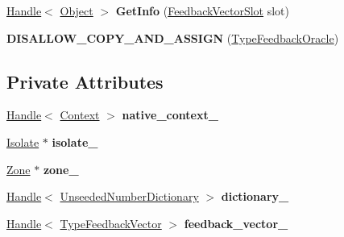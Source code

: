 \begin{DoxyCompactItemize}
\item 
\hyperlink{classv8_1_1internal_1_1_handle}{Handle}$<$ \hyperlink{classv8_1_1internal_1_1_object}{Object} $>$ {\bfseries Get\+Info} (\hyperlink{classv8_1_1internal_1_1_feedback_vector_slot}{Feedback\+Vector\+Slot} slot)\hypertarget{classv8_1_1internal_1_1_type_feedback_oracle_a4c30d4b5f974e80bd8af7c8eccbdd969}{}\label{classv8_1_1internal_1_1_type_feedback_oracle_a4c30d4b5f974e80bd8af7c8eccbdd969}

\item 
{\bfseries D\+I\+S\+A\+L\+L\+O\+W\+\_\+\+C\+O\+P\+Y\+\_\+\+A\+N\+D\+\_\+\+A\+S\+S\+I\+GN} (\hyperlink{classv8_1_1internal_1_1_type_feedback_oracle}{Type\+Feedback\+Oracle})\hypertarget{classv8_1_1internal_1_1_type_feedback_oracle_a8e885bb296bb4da312e35384d309c1af}{}\label{classv8_1_1internal_1_1_type_feedback_oracle_a8e885bb296bb4da312e35384d309c1af}

\end{DoxyCompactItemize}
\subsection*{Private Attributes}
\begin{DoxyCompactItemize}
\item 
\hyperlink{classv8_1_1internal_1_1_handle}{Handle}$<$ \hyperlink{classv8_1_1internal_1_1_context}{Context} $>$ {\bfseries native\+\_\+context\+\_\+}\hypertarget{classv8_1_1internal_1_1_type_feedback_oracle_a26b8279872c7ea341d1eef90efb31459}{}\label{classv8_1_1internal_1_1_type_feedback_oracle_a26b8279872c7ea341d1eef90efb31459}

\item 
\hyperlink{classv8_1_1internal_1_1_isolate}{Isolate} $\ast$ {\bfseries isolate\+\_\+}\hypertarget{classv8_1_1internal_1_1_type_feedback_oracle_a8eee3ecfa416e59556cf08e4c6ced0e2}{}\label{classv8_1_1internal_1_1_type_feedback_oracle_a8eee3ecfa416e59556cf08e4c6ced0e2}

\item 
\hyperlink{classv8_1_1internal_1_1_zone}{Zone} $\ast$ {\bfseries zone\+\_\+}\hypertarget{classv8_1_1internal_1_1_type_feedback_oracle_ab3af35974cda806106e9fecb7b78e04c}{}\label{classv8_1_1internal_1_1_type_feedback_oracle_ab3af35974cda806106e9fecb7b78e04c}

\item 
\hyperlink{classv8_1_1internal_1_1_handle}{Handle}$<$ \hyperlink{classv8_1_1internal_1_1_unseeded_number_dictionary}{Unseeded\+Number\+Dictionary} $>$ {\bfseries dictionary\+\_\+}\hypertarget{classv8_1_1internal_1_1_type_feedback_oracle_a90fd94e1fc310ca27878b74acee972de}{}\label{classv8_1_1internal_1_1_type_feedback_oracle_a90fd94e1fc310ca27878b74acee972de}

\item 
\hyperlink{classv8_1_1internal_1_1_handle}{Handle}$<$ \hyperlink{classv8_1_1internal_1_1_type_feedback_vector}{Type\+Feedback\+Vector} $>$ {\bfseries feedback\+\_\+vector\+\_\+}\hypertarget{classv8_1_1internal_1_1_type_feedback_oracle_a294b866371c1c6071ffbe2e71763f598}{}\label{classv8_1_1internal_1_1_type_feedback_oracle_a294b866371c1c6071ffbe2e71763f598}

\end{DoxyCompactItemize}



